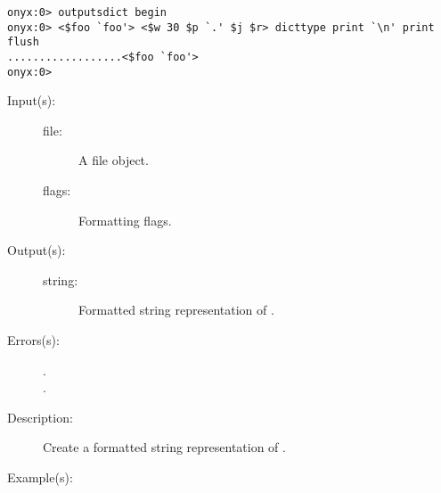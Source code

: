 \begin{description}
\begin{description}
\begin{verbatim}
onyx:0> outputsdict begin
onyx:0> <$foo `foo'> <$w 30 $p `.' $j $r> dicttype print `\n' print flush
..................<$foo `foo'>
onyx:0>
		\end{verbatim}
	\end{description}
\label{outputsdict:filetype}
\item[{\onyxop{file flags}{filetype}{string}}: ]
	\begin{description}\item[]
	\item[Input(s): ]
		\begin{description}\item[]
		\item[file: ]
			A file object.
		\item[flags: ]
			Formatting flags.
		\end{description}
	\item[Output(s): ]
		\begin{description}\item[]
		\item[string: ]
			Formatted string representation of .
		\end{description}
	\item[Errors(s): ]
		\begin{description}\item[]
		\item[.]
		\item[.]
		\end{description}
	\item[Description: ]
		Create a formatted string representation of .
	\item[Example(s): ]\begin{verbatim}


\end{verbatim}
\end{description}
\end{description}
